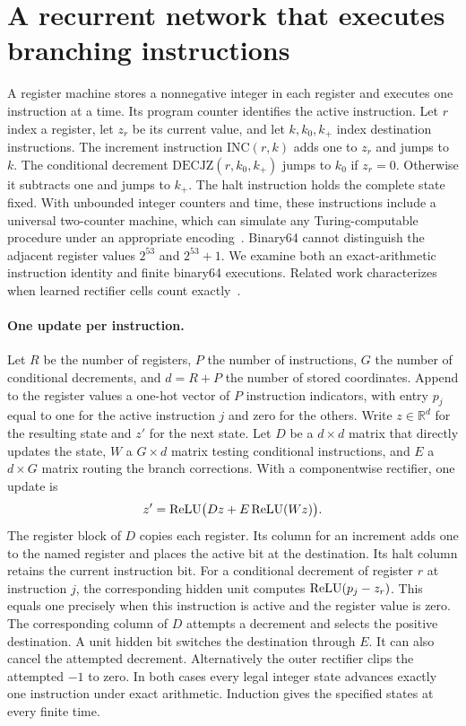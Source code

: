 \section{A recurrent network that executes branching instructions}\label{app:machine}
A register machine stores a nonnegative integer in each register and executes one instruction at a time. Its program counter identifies the active instruction. Let $r$ index a register, let $z_r$ be its current value, and let $k,k_0,k_+$ index destination instructions. The increment instruction $\mathrm{INC}(r,k)$ adds one to $z_r$ and jumps to $k$. The conditional decrement $\mathrm{DECJZ}(r,k_0,k_+)$ jumps to $k_0$ if $z_r=0$. Otherwise it subtracts one and jumps to $k_+$. The halt instruction holds the complete state fixed. With unbounded integer counters and time, these instructions include a universal two-counter machine, which can simulate any Turing-computable procedure under an appropriate encoding~\cite{dudenhefner2022machines}. Binary64 cannot distinguish the adjacent register values $2^{53}$ and $2^{53}+1$. We examine both an exact-arithmetic instruction identity and finite binary64 executions. Related work characterizes when learned rectifier cells count exactly~\cite{elnaggar2023counting}.

\paragraph{One update per instruction.}
Let $R$ be the number of registers, $P$ the number of instructions, $G$ the number of conditional decrements, and $d=R+P$ the number of stored coordinates. Append to the register values a one-hot vector of $P$ instruction indicators, with entry $p_j$ equal to one for the active instruction $j$ and zero for the others. Write $z\in\mathbb{R}^d$ for the resulting state and $z'$ for the next state. Let $D$ be a $d\times d$ matrix that directly updates the state, $W$ a $G\times d$ matrix testing conditional instructions, and $E$ a $d\times G$ matrix routing the branch corrections. With a componentwise rectifier, one update is
\[
       z'=\operatorname{ReLU}\bigl(Dz+E\operatorname{ReLU}(Wz)\bigr).
\]
The register block of $D$ copies each register. Its column for an increment adds one to the named register and places the active bit at the destination. Its halt column retains the current instruction bit. For a conditional decrement of register $r$ at instruction $j$, the corresponding hidden unit computes $\operatorname{ReLU}(p_j-z_r)$. This equals one precisely when this instruction is active and the register value is zero. The corresponding column of $D$ attempts a decrement and selects the positive destination. A unit hidden bit switches the destination through $E$. It can also cancel the attempted decrement. Alternatively the outer rectifier clips the attempted $-1$ to zero. In both cases every legal integer state advances exactly one instruction under exact arithmetic. Induction gives the specified states at every finite time.

